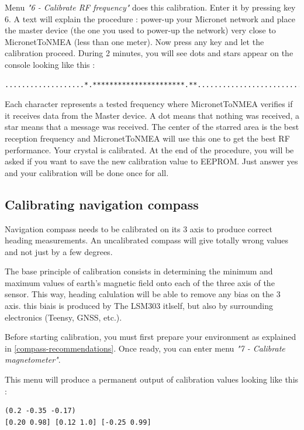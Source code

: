 \documentclass{report}
\begin{document}
Menu \emph{"6 - Calibrate RF frequency"} does this calibration. Enter it by pressing key 6. A text will explain the procedure : power-up your Micronet network and place the master device (the one you used to power-up the network) very close to MicronetToNMEA (less than one meter). Now press any key and let the calibration proceed. During 2 minutes, you will see dots and stars appear on the console looking like this :

\begin{verbatim}
...................*.**********************.**.....................................
\end{verbatim}

Each character represents a tested frequency where MicronetToNMEA verifies if it receives data from the Master device. A dot means that nothing was received, a star means that a message was received. The center of the starred area is the best reception frequency and MicronetToNMEA will use this one to get the best RF performance. Your crystal is calibrated.
At the end of the procedure, you will be asked if you want to save the new calibration value to EEPROM. Just answer yes and your calibration will be done once for all.

\subsection{Calibrating navigation compass}

Navigation compass needs to be calibrated on its 3 axis to produce correct heading measurements. An uncalibrated compass will give totally wrong values and not just by a few degrees.

The base principle of calibration consists in determining the minimum and maximum values of earth's magnetic field onto each of the three axis of the sensor. This way, heading calulation will be able to remove any bias on the 3 axis. this biais is produced by The LSM303 itlself, but also by surrounding electronics (Teensy, GNSS, etc.).

Before starting calibration, you must first prepare your environment as explained in \ref{compass-recommendations}. Once ready, you can enter menu \emph{"7 - Calibrate magnetometer"}.

This menu will produce a permanent output of calibration values looking like this :

\begin{verbatim}
(0.2 -0.35 -0.17)
[0.20 0.98] [0.12 1.0] [-0.25 0.99]
\end{verbatim}
\end{document}
